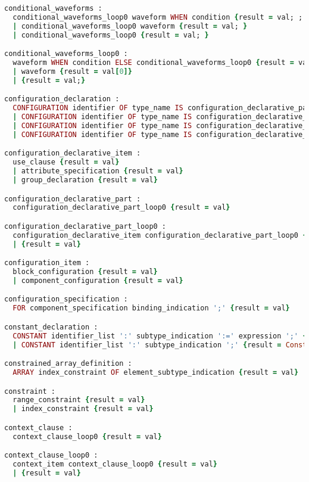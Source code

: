 \begin{lstlisting}[language=Ruby, style=rubystyle]
conditional_waveforms :
  conditional_waveforms_loop0 waveform WHEN condition {result = val; ; }
  | conditional_waveforms_loop0 waveform {result = val; }
  | conditional_waveforms_loop0 {result = val; }

conditional_waveforms_loop0 :
  waveform WHEN condition ELSE conditional_waveforms_loop0 {result = val.flatten}
  | waveform {result = val[0]}
  | {result = val;}

configuration_declaration :
  CONFIGURATION identifier OF type_name IS configuration_declarative_part block_configuration END CONFIGURATION configuration_simple_name ';' {result = val}
  | CONFIGURATION identifier OF type_name IS configuration_declarative_part block_configuration END configuration_simple_name ';' {result = val}
  | CONFIGURATION identifier OF type_name IS configuration_declarative_part block_configuration END CONFIGURATION ';' {result = val}
  | CONFIGURATION identifier OF type_name IS configuration_declarative_part block_configuration END ';' {result = val}

configuration_declarative_item :
  use_clause {result = val}
  | attribute_specification {result = val}
  | group_declaration {result = val}

configuration_declarative_part :
  configuration_declarative_part_loop0 {result = val}

configuration_declarative_part_loop0 :
  configuration_declarative_item configuration_declarative_part_loop0 {result = val}
  | {result = val}

configuration_item :
  block_configuration {result = val}
  | component_configuration {result = val}

configuration_specification :
  FOR component_specification binding_indication ';' {result = val}

constant_declaration :
  CONSTANT identifier_list ':' subtype_indication ':=' expression ';' {result = ConstantDeclaration.new(val[1], val[3], val[5]); }
  | CONSTANT identifier_list ':' subtype_indication ';' {result = ConstantDeclaration.new(val[1], val[3], nil);}

constrained_array_definition :
  ARRAY index_constraint OF element_subtype_indication {result = val}

constraint :
  range_constraint {result = val}
  | index_constraint {result = val}

context_clause :
  context_clause_loop0 {result = val}

context_clause_loop0 :
  context_item context_clause_loop0 {result = val}
  | {result = val}


\end{lstlisting}
